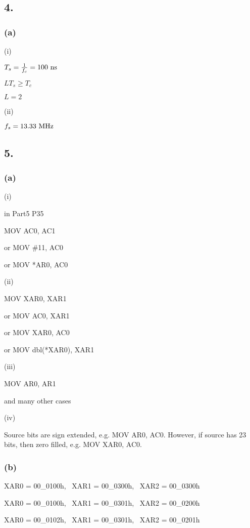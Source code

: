 \documentclass{article}
\begin{document}
\subsection*{4.}
\subsubsection*{(a)}
(i)\par
$T_{s}=\frac{1}{f_{c}}=100 \ {\rm ns}$\par
$LT_{s} \geq T_{c}$\par
$L=2$\par\indent
\par
(ii)\par
$f_{s}=13.33 \ {\rm MHz}$


\subsection*{5.}
\subsubsection*{(a)}
(i)\par
in Part5 P35\par
MOV AC0, AC1\par
or MOV \#11, AC0\par
or MOV *AR0, AC0\par\indent
\par
(ii)\par
MOV XAR0, XAR1\par
or MOV AC0, XAR1\par
or MOV XAR0, AC0\par
or MOV dbl(*XAR0), XAR1\par\indent
\par
(iii)\par
MOV AR0, AR1\par
and many other cases\par\indent
\par
(iv)\par
Source bits are sign extended, e.g. MOV AR0, AC0. However, if source has 23 bits, then zero filled, e.g. MOV XAR0, AC0.

\subsubsection*{(b)}
XAR0 = 00\_0100h, \ XAR1 = 00\_0300h, \ XAR2 = 00\_0300h\par

XAR0 = 00\_0100h, \ XAR1 = 00\_0301h, \ XAR2 = 00\_0200h\par

XAR0 = 00\_0102h, \ XAR1 = 00\_0301h, \ XAR2 = 00\_0201h\par
\end{document}
